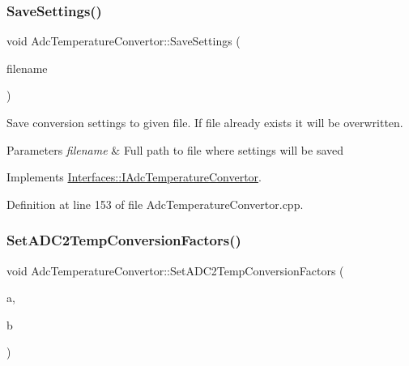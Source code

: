 \subsubsection{\texorpdfstring{Save\+Settings()}{SaveSettings()}}
{\footnotesize\ttfamily void Adc\+Temperature\+Convertor\+::\+Save\+Settings (\begin{DoxyParamCaption}\item[{Q\+String}]{filename }\end{DoxyParamCaption})\hspace{0.3cm}{\ttfamily [virtual]}}



Save conversion settings to given file. If file already exists it will be overwritten. 


\begin{DoxyParams}{Parameters}
{\em filename} & Full path to file where settings will be saved \\
\hline
\end{DoxyParams}


Implements \hyperlink{class_interfaces_1_1_i_adc_temperature_convertor_a6631e979e067ab78d3e5c337449876ac}{Interfaces\+::\+I\+Adc\+Temperature\+Convertor}.



Definition at line 153 of file Adc\+Temperature\+Convertor.\+cpp.

\mbox{\label{class_adc_temperature_convertor_a5a19355f805554763e914e5b2216d5f6}} 
\subsubsection{\texorpdfstring{Set\+A\+D\+C2\+Temp\+Conversion\+Factors()}{SetADC2TempConversionFactors()}}
{\footnotesize\ttfamily void Adc\+Temperature\+Convertor\+::\+Set\+A\+D\+C2\+Temp\+Conversion\+Factors (\begin{DoxyParamCaption}\item[{double}]{a,  }\item[{double}]{b }\end{DoxyParamCaption})\hspace{0.3cm}{\ttfamily [virtual]}}



